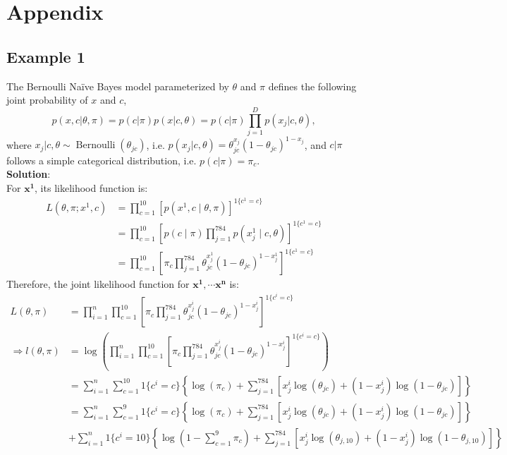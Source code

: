 \section{Appendix}
\subsection{Example 1}
\label{example-1}
The Bernoulli Naïve Bayes model parameterized by $\theta$ and $\pi$ defines the following joint probability of $x$ and $c$,
$$p(x,c|\theta,\pi) = p(c|\pi)p(x|c,\theta) = p(c|\pi)\prod_{j=1}^{D}p(x_j|c,\theta),$$
where $x_j | c,\theta \sim \operatorname{Bernoulli}(\theta_{jc})$, i.e. $p(x_j | c,\theta) = \theta_{jc}^{x_j}(1-\theta_{jc})^{1-x_j}$, and $c|\pi$ follows a simple categorical distribution, i.e. $p(c|\pi) = \pi_c$.\\
\textbf{Solution}:\\
For $\mathbf{x^1}$, its likelihood function is:
\begin{align}
    L(\theta, \pi; x^1, c) &= \prod_{c = 1}^{10} \left[ p(x^1, c \mid \theta, \pi) \right]^{1\{ c^1 = c \}} \\
    &= \prod_{c = 1}^{10} \left[ p(c \mid \pi) \prod_{j = 1}^{784} p(x_j^1 \mid c, \theta) \right]^{1\{ c^1 = c \}} \\
    &= \prod_{c = 1}^{10} \left[ \pi_c \prod_{j = 1}^{784} \theta_{jc}^{x_j^1} (1-\theta_{jc})^{1-{x_j^1}} \right]^{1\{ c^1 = c \}}
\end{align}
Therefore, the joint likelihood function for $\mathbf{x^1}, \cdots \mathbf{x^n}$ is:
\begin{align}
    L(\theta, \pi) &= \prod_{i = 1}^{n} \prod_{c = 1}^{10} \left[ \pi_c \prod_{j = 1}^{784} \theta_{jc}^{x_j^i} (1-\theta_{jc})^{1-{x_j^i}} \right]^{1\{ c^i = c \}} \\
    \Rightarrow l(\theta, \pi) &= \log \left( \prod_{i = 1}^{n} \prod_{c = 1}^{10} \left[ \pi_c \prod_{j = 1}^{784} \theta_{jc}^{x_j^i} (1-\theta_{jc})^{1-{x_j^i}} \right]^{1\{ c^i = c \}} \right) \\
    &= \sum_{i = 1}^{n} \sum_{c = 1}^{10} 1\{ c^i = c \} \left\{ \log(\pi_c) + \sum_{j = 1}^{784} \left[ x_j^i \log(\theta_{jc}) + (1-x_j^i) \log(1-\theta_{jc}) \right] \right\} \\
    &= \sum_{i = 1}^{n} \sum_{c = 1}^{9} 1\{ c^i = c \} \left\{ \log(\pi_c) + \sum_{j = 1}^{784} \left[ x_j^i \log(\theta_{jc}) + (1-x_j^i) \log(1-\theta_{jc}) \right] \right\} \\
    &+ \sum_{i = 1}^{n} 1\{ c^i = 10 \} \left\{ \log(1 - \sum_{c = 1}^{9}\pi_{c}) + \sum_{j = 1}^{784} \left[ x_j^i \log(\theta_{j,10}) + (1-x_j^i) \log(1-\theta_{j,10}) \right] \right\}
\end{align}
